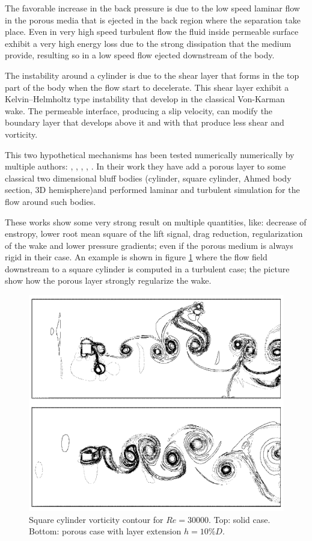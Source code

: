 The favorable increase in the back pressure is due to the low speed laminar flow in the porous media that is ejected in the back region where the separation take place.
Even in very high speed turbulent flow the fluid inside permeable surface exhibit a very high energy loss due to the strong dissipation that the medium provide, resulting so in a low speed flow ejected downstream of the body.

The instability around a cylinder is due to the shear layer that forms in the top part of the body when the flow start to decelerate.
This shear layer exhibit a Kelvin–Helmholtz type instability that develop in the classical Von-Karman wake.
The permeable interface, producing a slip velocity, can modify the boundary layer that develops above it and with that produce less shear and vorticity.

This two hypothetical mechanisms has been tested numerically numerically by multiple authors: \citet{bruneau2004passive}, \citet{bruneau2008numerical}, \citet{bhattacharyya2011reduction}, \citet{naito2012numerical}, \citet{mimeau2017passive}.
In their work they have add a porous layer to some classical two dimensional bluff bodies (cylinder, square cylinder, Ahmed body section, 3D hemisphere)and performed laminar and turbulent simulation for the flow around such bodies.

These works show some very strong result on multiple quantities, like: decrease of enstropy, lower root mean square of the lift signal, drag reduction, regularization of the wake and lower pressure gradients; even if the porous medium is always rigid in their case.
An example is shown in figure \ref{fig:porous_cylinder} where the flow field downstream to a square cylinder is computed in a turbulent case; the picture show how the porous layer strongly regularize the wake.

\begin{figure}[h]
	\centering
	\includegraphics[width=0.7\linewidth]{chapter_1/cylinder_porous}
	\caption{Square cylinder vorticity contour for $Re=30000$. Top: solid case. Bottom: porous case with layer extension $h=10\% D$.}
	\label{fig:porous_cylinder}
\end{figure}


